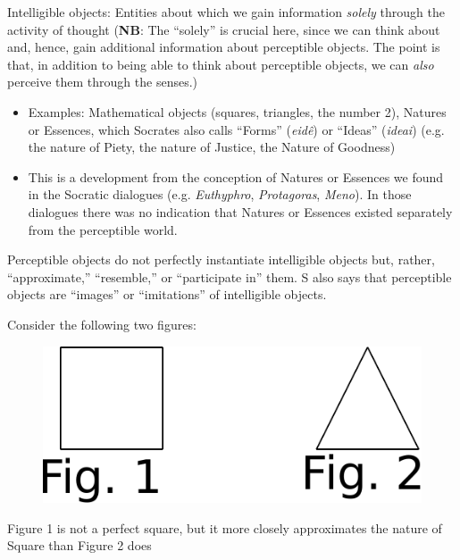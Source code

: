 \documentclass[11pt]{article}
\begin{document}
\noindent Intelligible objects: Entities about which we gain information \emph{solely} through the activity of thought (\textbf{NB}: The ``solely'' is crucial here, since we can think about and, hence, gain additional information about perceptible objects. The point is that, in addition to being able to think about perceptible objects, we can \emph{also} perceive them through the senses.)

\begin{itemize}\item{Examples: Mathematical objects (squares, triangles, the number 2), Natures or Essences, which Socrates also calls ``Forms'' (\emph{eid\^{e}}) or ``Ideas'' (\emph{ideai}) (e.g. the nature of Piety, the nature of Justice, the Nature of Goodness)}\item{This is a development from the conception of Natures or Essences we found in the Socratic dialogues (e.g. \emph{Euthyphro}, \emph{Protagoras}, \emph{Meno}). In those dialogues there was no indication that Natures or Essences existed separately from the perceptible world.}\end{itemize}

\noindent Perceptible objects do not perfectly instantiate intelligible objects but, rather, ``approximate,'' ``resemble,'' or ``participate in'' them. S also says that perceptible objects are ``images'' or ``imitations'' of intelligible objects.
\vspace*{2mm}

\noindent Consider the following two figures:

\begin{figure}[h!]
\hspace*{35mm}
\includegraphics[scale=0.6]{figure1}
\end{figure}

\noindent Figure 1 is not a perfect square, but it more closely approximates the nature of Square than Figure 2 does
\vspace*{2mm}
\end{document}
